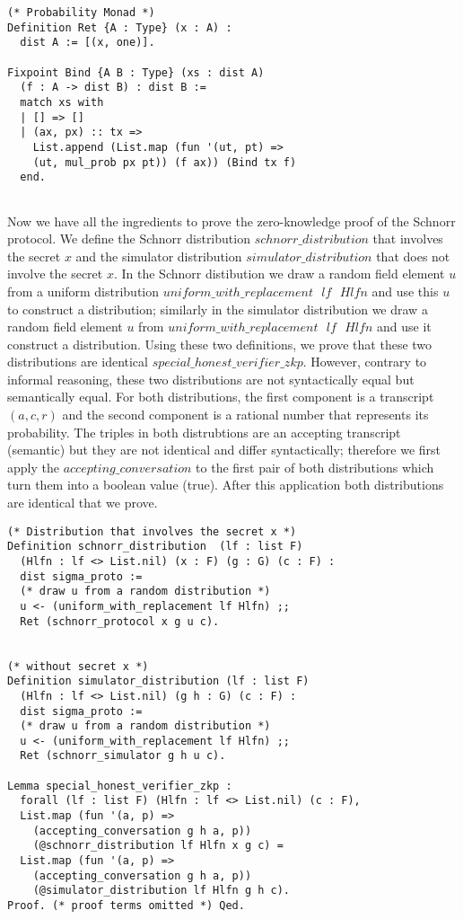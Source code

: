 \documentclass[conference,compsoc]{IEEEtran}
\begin{document}
    
\begin{lstlisting}[language=Coq]
(* Probability Monad *)
Definition Ret {A : Type} (x : A) : 
  dist A := [(x, one)].

Fixpoint Bind {A B : Type} (xs : dist A)  
  (f : A -> dist B) : dist B := 
  match xs with 
  | [] => [] 
  | (ax, px) :: tx => 
    List.append (List.map (fun '(ut, pt) => 
    (ut, mul_prob px pt)) (f ax)) (Bind tx f)
  end.


\end{lstlisting}

  
Now we have all the ingredients to prove the zero-knowledge 
proof of the Schnorr protocol. We define the 
Schnorr distribution $schnorr\_distribution$
that involves the secret $x$ and 
the simulator distribution $simulator\_distribution$
that does not involve the secret $x$. 
In the Schnorr distibution we draw 
a random field element $u$ from a uniform 
distribution $uniform\_with\_replacement \text{ }lf \text{ } Hlfn$
and use this $u$ to construct a distribution; 
similarly in the simulator distribution 
we draw a random field element $u$ from 
$uniform\_with\_replacement \text{ }lf \text{ } Hlfn$
and use it construct a distribution. Using these 
two definitions, we prove that these two 
distributions are identical 
$special\_honest\_verifier\_zkp$. However, 
contrary to informal reasoning, these two 
distributions are not syntactically equal but 
semantically equal. For both distributions, 
the first component is a transcript $(a, c, r)$ and 
the second component is a rational number that represents 
its probability. The triples in both distrubtions 
are an accepting transcript (semantic) but they 
are not identical and differ syntactically; 
therefore we first apply the 
$accepting\_conversation$ to the first pair of 
both distributions which turn them into 
a boolean value (true). After this  
application both distributions are identical 
that we prove. 




\begin{lstlisting}[language=Coq]
(* Distribution that involves the secret x *)
Definition schnorr_distribution  (lf : list F) 
  (Hlfn : lf <> List.nil) (x : F) (g : G) (c : F) : 
  dist sigma_proto :=
  (* draw u from a random distribution *)
  u <- (uniform_with_replacement lf Hlfn) ;;
  Ret (schnorr_protocol x g u c).

  
(* without secret x *)
Definition simulator_distribution (lf : list F) 
  (Hlfn : lf <> List.nil) (g h : G) (c : F) : 
  dist sigma_proto :=
  (* draw u from a random distribution *)
  u <- (uniform_with_replacement lf Hlfn) ;;
  Ret (schnorr_simulator g h u c).
  
Lemma special_honest_verifier_zkp : 
  forall (lf : list F) (Hlfn : lf <> List.nil) (c : F), 
  List.map (fun '(a, p) => 
    (accepting_conversation g h a, p))
    (@schnorr_distribution lf Hlfn x g c) = 
  List.map (fun '(a, p) => 
    (accepting_conversation g h a, p))
    (@simulator_distribution lf Hlfn g h c).
Proof. (* proof terms omitted *) Qed. 
  \end{lstlisting}
\end{document}
